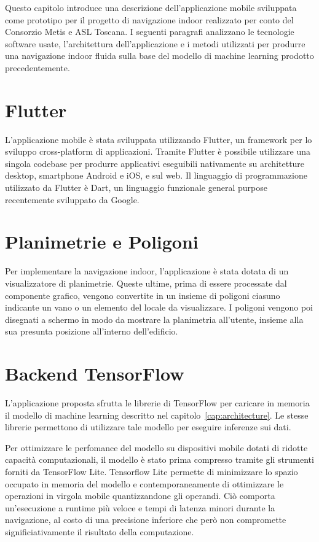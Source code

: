 
Questo capitolo introduce una descrizione dell'applicazione mobile sviluppata
come prototipo per il progetto di navigazione indoor realizzato per conto del
Consorzio Metis e ASL Toscana. I seguenti paragrafi analizzano le tecnologie
software usate, l'architettura dell'applicazione e i metodi utilizzati per
produrre una navigazione indoor fluida sulla base del modello di machine
learning prodotto precedentemente.
\section{Flutter}
L'applicazione mobile è stata sviluppata utilizzando 
Flutter\cite{flutter}, un framework per lo sviluppo cross-platform di
applicazioni. Tramite Flutter è possibile utilizzare una singola codebase per
produrre applicativi eseguibili nativamente su architetture desktop, smartphone
Android e iOS, e sul web. Il linguaggio di programmazione utilizzato da Flutter
è Dart, un linguaggio funzionale general purpose recentemente sviluppato da
Google.
\section{Planimetrie e Poligoni}
Per implementare la navigazione indoor, l'applicazione è stata dotata di un
visualizzatore di planimetrie. Queste ultime, prima di essere processate dal
componente grafico, vengono convertite in un insieme di poligoni ciasuno
indicante un vano o un elemento del locale da visualizzare. I poligoni vengono
poi disegnati a schermo in modo da mostrare la planimetria all'utente, insieme
alla sua presunta posizione all'interno dell'edificio.
\section{Backend TensorFlow}
L'applicazione proposta sfrutta le librerie di TensorFlow per caricare in
memoria il modello di machine learning descritto nel
capitolo~\ref{cap:architecture}. Le stesse librerie permettono di utilizzare
tale modello per eseguire inferenze sui dati. 

Per ottimizzare le perfomance del modello su dispositivi mobile dotati di
ridotte capacità computazionali, il modello è stato prima compresso tramite
gli strumenti forniti da TensorFlow Lite\cite{tensorflow-lite}. Tensorflow Lite
permette di minimizzare lo spazio occupato in memoria del modello e
contemporaneamente di ottimizzare le operazioni in virgola mobile
quantizzandone gli operandi. Ciò comporta un'esecuzione a runtime più veloce e
tempi di latenza minori durante la navigazione, al costo di una precisione
inferiore che però non compromette significiativamente il risultato della
computazione.
